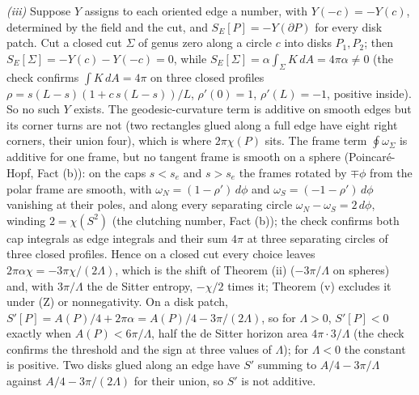 \emph{(iii)} Suppose $Y$ assigns to each oriented edge a number, with $Y(-c) = -Y(c)$, determined by the field and the cut, and $S_{E}[P] = -Y(\partial P)$ for every disk patch. Cut a closed cut $\Sigma$ of genus zero along a circle $c$ into disks $P_{1}, P_{2}$; then $S_{E}[\Sigma] = -Y(c) - Y(-c) = 0$, while $S_{E}[\Sigma] = \alpha\int_{\Sigma}K\,dA = 4\pi\alpha \neq 0$ (the check confirms $\int K\,dA = 4\pi$ on three closed profiles $\rho = s(L - s)(1 + c\,s(L - s))/L$, $\rho'(0) = 1$, $\rho'(L) = -1$, positive inside). So no such $Y$ exists. The geodesic-curvature term is additive on smooth edges but its corner turns are not (two rectangles glued along a full edge have eight right corners, their union four), which is where $2\pi\chi(P)$ sits. The frame term $\oint\omega_{\Sigma}$ is additive for one frame, but no tangent frame is smooth on a sphere (Poincar\'e-Hopf, Fact (b)): on the caps $s < s_{e}$ and $s > s_{e}$ the frames rotated by $\mp\phi$ from the polar frame are smooth, with $\omega_{N} = (1 - \rho')\,d\phi$ and $\omega_{S} = (-1 - \rho')\,d\phi$ vanishing at their poles, and along every separating circle $\omega_{N} - \omega_{S} = 2\,d\phi$, winding $2 = \chi(S^{2})$ (the clutching number, Fact (b)); the check confirms both cap integrals as edge integrals and their sum $4\pi$ at three separating circles of three closed profiles. Hence on a closed cut every choice leaves $2\pi\alpha\chi = -3\pi\chi/(2\Lambda)$, which is the shift of Theorem (ii) ($-3\pi/\Lambda$ on spheres) and, with $3\pi/\Lambda$ the de Sitter entropy, $-\chi/2$ times it; Theorem (v) excludes it under (Z) or nonnegativity. On a disk patch, $S'[P] = A(P)/4 + 2\pi\alpha = A(P)/4 - 3\pi/(2\Lambda)$, so for $\Lambda > 0$, $S'[P] < 0$ exactly when $A(P) < 6\pi/\Lambda$, half the de Sitter horizon area $4\pi\cdot 3/\Lambda$ (the check confirms the threshold and the sign at three values of $\Lambda$); for $\Lambda < 0$ the constant is positive. Two disks glued along an edge have $S'$ summing to $A/4 - 3\pi/\Lambda$ against $A/4 - 3\pi/(2\Lambda)$ for their union, so $S'$ is not additive.

